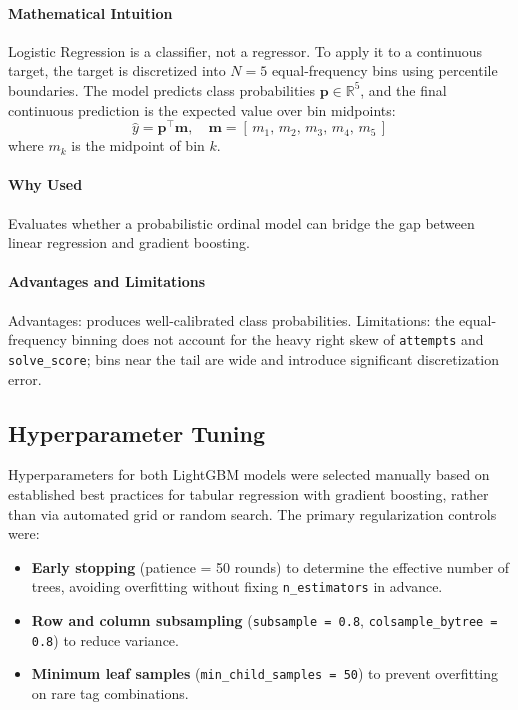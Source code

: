 \documentclass[12pt,a4paper]{article}
\begin{document}
\paragraph{Mathematical Intuition}
Logistic Regression is a classifier, not a regressor. To apply it to a
continuous target, the target is discretized into $N=5$ equal-frequency bins
using percentile boundaries. The model predicts class probabilities
$\mathbf{p} \in \mathbb{R}^5$, and the final continuous prediction is the
expected value over bin midpoints:
\[
    \hat{y} = \mathbf{p}^\top \mathbf{m}, \quad
    \mathbf{m} = [\,m_1,\, m_2,\, m_3,\, m_4,\, m_5\,]
\]
where $m_k$ is the midpoint of bin $k$.

\paragraph{Why Used}
Evaluates whether a probabilistic ordinal model can bridge the gap between linear
regression and gradient boosting.

\paragraph{Advantages and Limitations}
Advantages: produces well-calibrated class probabilities. \newline
Limitations: the equal-frequency binning does not account for the heavy right skew of \texttt{attempts} and \texttt{solve\_score}; bins near the tail are wide
and introduce significant discretization error.

\subsection*{Hyperparameter Tuning}

Hyperparameters for both LightGBM models were selected manually based on
established best practices for tabular regression with gradient boosting, rather
than via automated grid or random search. The primary regularization controls
were:

\begin{itemize}
    \item \textbf{Early stopping} (patience = 50 rounds) to determine the
          effective number of trees, avoiding overfitting without fixing
          \texttt{n\_estimators} in advance.
    \item \textbf{Row and column subsampling}
          (\texttt{subsample = 0.8}, \texttt{colsample\_bytree = 0.8})
          to reduce variance.
    \item \textbf{Minimum leaf samples} (\texttt{min\_child\_samples = 50})
          to prevent overfitting on rare tag combinations.
\end{itemize}
\end{document}

